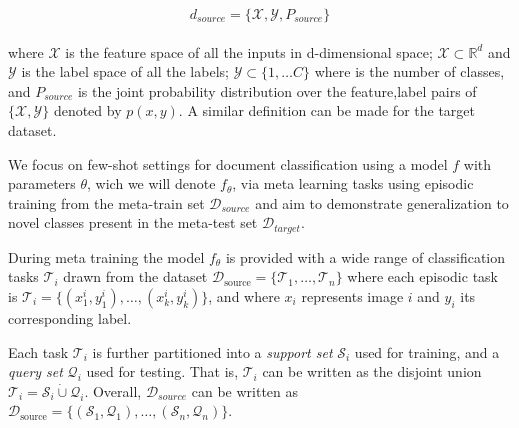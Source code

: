 \begin{equation}
  \label{eqn:dist}
 d_{source}=\{\mathcal{X}, \mathcal{Y}, P_{source}\}
\end{equation}
\\
where $\mathcal{X}$ is the feature space of all the inputs in d-dimensional space; $\mathcal{X} \subset \mathbb{R}^{d} $ and $\mathcal{Y}$ is the label space of all the labels;  $\mathcal{Y} \subset  \{1, \ldots C\}$ where is the number of classes,  and  $P_{source}$ is the joint probability distribution over the feature,label pairs of  $\{ \mathcal{X}, \mathcal{Y}\}$ denoted by $p(x,y)$. A similar definition can be made for the target dataset.

We focus on few-shot settings for document classification using a model $f$ with parameters $\theta$, wich we will denote $f_{\theta}$, via meta learning tasks using episodic training from the meta-train set $\mathcal{D}_{source}$ and aim to demonstrate generalization to novel classes present in the meta-test set  $\mathcal{D}_{target}$. 

During meta training the model $f_{\theta}$ is provided with a wide range of classification tasks  $\mathcal{T}_i$ drawn from the dataset $\mathcal{D}_{\text {source}}=\{\mathcal{T}_{1}, \ldots, \mathcal{T}_{n}\}$ where each episodic task is $\mathcal{T}_{i}=\{(x_{1}^{i}, y_{1}^{i}), \ldots,(x_{k}^{i}, y_{k}^{i})\}$, and where ${x}_{i}$ represents image $i$ and ${y}_{i}$ its corresponding label. 

Each task $\mathcal{T}_i$ is further partitioned into a \textit{support set} $\mathcal{S}_i$ used for training, and a  \textit{query set} $\mathcal{Q}_i$ used for testing. That is, $\mathcal{T}_i$ can be written as the disjoint union $\mathcal{T}_i = \mathcal{S}_i \dot{\cup} \mathcal{Q}_i$. Overall, $\mathcal{D}_{source}$ can be written as  $\mathcal{D}_{\text {source}} = \{ (\mathcal{S}_1, \mathcal{Q}_1), \ldots, (\mathcal{S}_n, \mathcal{Q}_n)  \}$.

